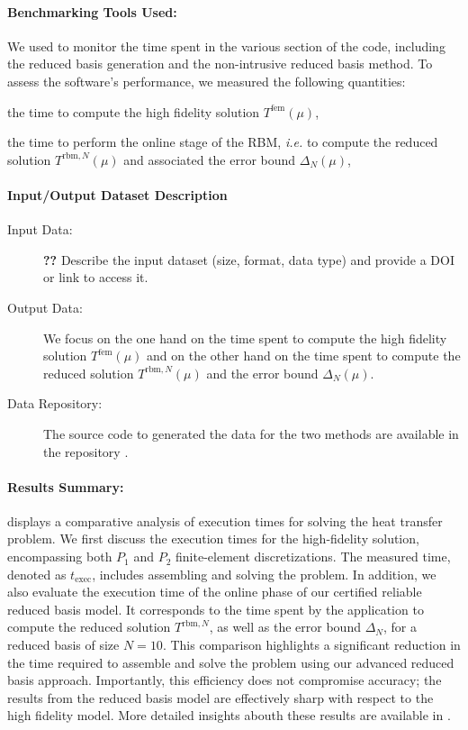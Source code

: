 \paragraph{Benchmarking Tools Used:} We used \Feelpp to monitor the time spent in the various section of the code, including the reduced basis generation and the non-intrusive reduced basis method. To assess the software's performance, we measured the following quantities:
\begin{inparaenum}[\it (i)]
    \item the time to compute the high fidelity solution $T^\text{fem}(\mu)$,
    \item the time to perform the online stage of the RBM, \emph{i.e.} to compute the reduced solution $T^{\text{rbm}, N}(\mu)$ and associated the error bound $\Delta_N(\mu)$,
\end{inparaenum}

\paragraph{Input/Output Dataset Description}

\begin{description}
    \item[Input Data:] \textbf{??} Describe the input dataset (size, format, data type) and provide a DOI or link to access it.
    \item[Output Data:] We focus on the one hand on the time spent to compute the high fidelity solution $T^\text{fem}(\mu)$ and on the other hand on the time spent to compute the reduced solution $T^{\text{rbm}, N}(\mu)$ and the error bound $\Delta_N(\mu)$.
    \item[Data Repository:] The source code to generated the data for the two methods are available in the \Feelpp repository \cite{prudhomme_feelppfeelpp_2024}.
\end{description}

\paragraph{Results Summary:}

 displays a comparative analysis of execution times for solving the heat transfer problem.
We first discuss the execution times for the high-fidelity solution, encompassing both $P_1$ and $P_2$ finite-element discretizations.
The measured time, denoted as $t_\text{exec}$, includes assembling and solving the problem.
In addition, we also evaluate the execution time of the online phase of our certified reliable reduced basis model.
It corresponds to the time spent by the application to compute the reduced solution $T^{\text{rbm},N}$, as well as the error bound $\Delta_N$, for a reduced basis of size $N=10$.
This comparison highlights a significant reduction in the time required to assemble and solve the problem using our advanced reduced basis approach.
Importantly, this efficiency does not compromise accuracy; the results from the reduced basis model are effectively sharp with respect to the high fidelity model.
More detailed insights abouth these results are available in \cite{saigre_model_2024}.

